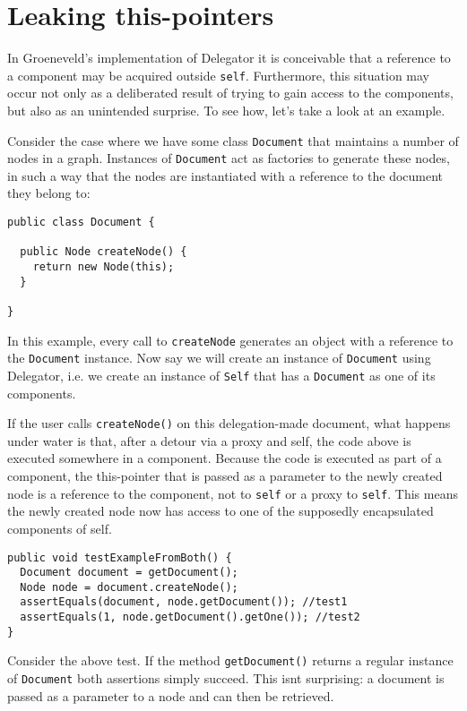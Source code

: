 \documentclass[a4paper,12pt]{book}
\begin{document}
\section*{Leaking this-pointers}
In Groeneveld's implementation of Delegator it is conceivable that a reference to a component may be acquired outside \verb|self|. Furthermore, this situation may occur not only as a deliberated result of trying to gain access to the components, but also as an unintended surprise. To see how, let's take a look at an example.

Consider the case where we have some class \verb|Document| that maintains a number of nodes in a graph. Instances of \verb|Document| act as factories to generate these nodes, in such a way that the nodes are instantiated with a reference to the document they belong to:

\begin{verbatim} 
public class Document {

  public Node createNode() {
    return new Node(this);
  }

}
\end{verbatim}

In this example, every call to \verb|createNode| generates an object with a reference to the \verb|Document| instance. Now say we will create an instance of \verb|Document| using Delegator, i.e. we create an instance of \verb|Self| that has a \verb|Document| as one of its components. 

If the user calls \verb|createNode()| on this delegation-made document, what happens under water is that, after a detour via a proxy and self, the code above is executed somewhere in a component. Because the code is executed as part of a component, the this-pointer that is passed as a parameter to the newly created node is a reference to the component, not to \verb|self| or a proxy to \verb|self|. This means the newly created node now has access to one of the supposedly encapsulated components of self.

\begin{verbatim}
public void testExampleFromBoth() {
  Document document = getDocument();
  Node node = document.createNode();
  assertEquals(document, node.getDocument()); //test1
  assertEquals(1, node.getDocument().getOne()); //test2
}
\end{verbatim}

Consider the above test. If the method \verb|getDocument()| returns a regular instance of \verb|Document| both assertions simply succeed. This isnt surprising: a document is passed as a parameter to a node and can then be retrieved.
\end{document}
